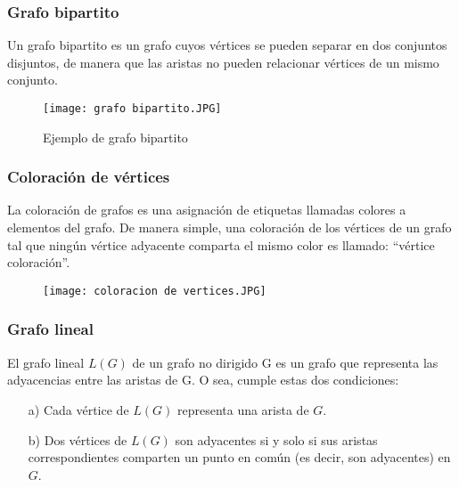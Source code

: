 \documentclass[letterpaper,12pt]{article}
\begin{document}
    \subsubsection{Grafo bipartito} 
     Un grafo bipartito es un grafo cuyos vértices se pueden separar en dos conjuntos disjuntos, de manera que las aristas no pueden relacionar vértices de un mismo conjunto. 
    \begin{figure} [h]
        \centering
        \texttt{[image: grafo bipartito.JPG]}
        \caption{Ejemplo de grafo bipartito}
        \label{Ejemplo de grafo bipartito}
    \end{figure} 
    \subsubsection{Coloración de vértices}
    La coloración de grafos es una asignación de etiquetas llamadas colores a elementos del grafo. De manera simple, una coloración de los vértices de un grafo tal que ningún vértice adyacente comparta el mismo color es llamado: “vértice coloración”. 
    \begin{figure} [h]
        \centering
        \texttt{[image: coloracion de vertices.JPG]}
        \label{fig:my_label}
    \end{figure}
    \subsubsection{Grafo lineal}
    El grafo lineal $L(G)$ de un grafo no dirigido G es un grafo que representa las adyacencias entre las aristas de G. O sea, cumple estas dos condiciones:
    \begin{itemize}
        \item [a)] Cada vértice de $L(G)$ representa una arista de $G$.
        \item[b)] Dos vértices de $L(G)$ son adyacentes si y solo si sus aristas correspondientes comparten un punto en común (es decir, son adyacentes) en $G$.

    \end{itemize}
    
    \begin{figure} [H]
        \centering
        \label{fig:my_label}
    \end{figure}
    \begin{figure} [H]
        \centering
        \label{fig:my_label}
    \end{figure}
\end{document}
